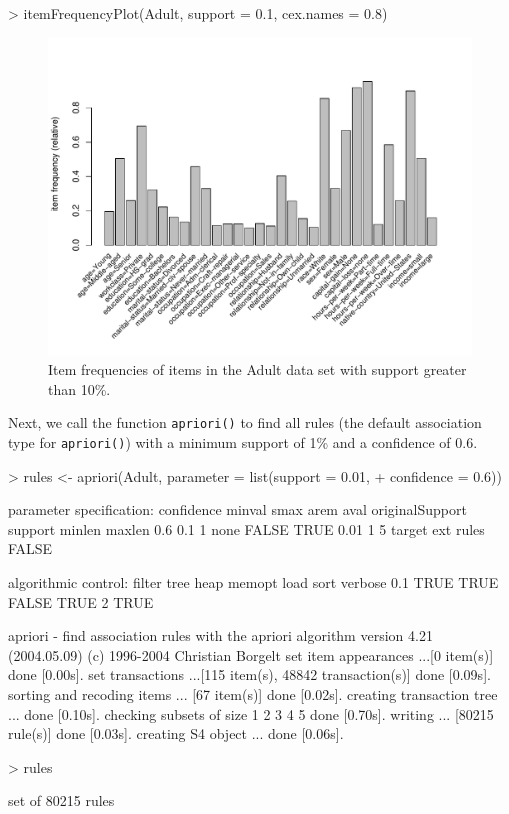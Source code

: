\documentclass[10pt,a4paper]{article}
\newcommand{\func}[1]{\mbox{\texttt{#1()}}}
\begin{document}
\begin{Schunk}
\begin{Sinput}
> itemFrequencyPlot(Adult, support = 0.1, cex.names = 0.8)
\end{Sinput}
\end{Schunk}
\begin{figure}
\centering
\includegraphics{arules-019}
\caption{Item frequencies of items in the Adult data set with support greater than 10\%.}
\label{fig:itemFrequencyPlot}
\end{figure}

Next, we call the function
\func{apriori} to find all rules (the default association type for
\func{apriori}) with a minimum support of 1\% and a confidence of 0.6.

\begin{Schunk}
\begin{Sinput}
> rules <- apriori(Adult, parameter = list(support = 0.01, 
+     confidence = 0.6))
\end{Sinput}
\begin{Soutput}
parameter specification:
 confidence minval smax arem  aval originalSupport support minlen maxlen
        0.6    0.1    1 none FALSE            TRUE    0.01      1      5
 target   ext
  rules FALSE

algorithmic control:
 filter tree heap memopt load sort verbose
    0.1 TRUE TRUE  FALSE TRUE    2    TRUE

apriori - find association rules with the apriori algorithm
version 4.21 (2004.05.09)        (c) 1996-2004   Christian Borgelt
set item appearances ...[0 item(s)] done [0.00s].
set transactions ...[115 item(s), 48842 transaction(s)] done [0.09s].
sorting and recoding items ... [67 item(s)] done [0.02s].
creating transaction tree ... done [0.10s].
checking subsets of size 1 2 3 4 5 done [0.70s].
writing ... [80215 rule(s)] done [0.03s].
creating S4 object  ... done [0.06s].
\end{Soutput}
\begin{Sinput}
> rules
\end{Sinput}
\begin{Soutput}
set of 80215 rules 
\end{Soutput}
\end{Schunk}
\end{document}
